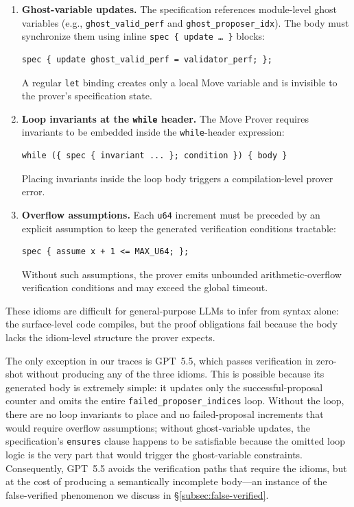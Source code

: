 \begin{enumerate}
    \item \textbf{Ghost-variable updates.}
    The specification references module-level ghost variables (e.g., \texttt{ghost\_valid\_perf} and \texttt{ghost\_proposer\_idx}).
    The body must synchronize them using inline \texttt{spec\,\{\,update\,\ldots\,\}} blocks:
    \begin{lstlisting}[language=Move,basicstyle=\small\ttfamily]
spec { update ghost_valid_perf = validator_perf; };
    \end{lstlisting}
    A regular \texttt{let} binding creates only a local Move variable and is invisible to the prover's specification state.

    \item \textbf{Loop invariants at the \texttt{while} header.}
    The Move Prover requires invariants to be embedded inside the \texttt{while}-header expression:
    \begin{lstlisting}[language=Move,basicstyle=\small\ttfamily]
while ({ spec { invariant ... }; condition }) { body }
    \end{lstlisting}
    Placing invariants inside the loop body triggers a compilation-level prover error.

    \item \textbf{Overflow assumptions.}
    Each \texttt{u64} increment must be preceded by an explicit assumption to keep the generated verification conditions tractable:
    \begin{lstlisting}[language=Move,basicstyle=\small\ttfamily]
spec { assume x + 1 <= MAX_U64; };
    \end{lstlisting}
    Without such assumptions, the prover emits unbounded arithmetic-overflow verification conditions and may exceed the global timeout.
\end{enumerate}

These idioms are difficult for general-purpose LLMs to infer from syntax alone: the surface-level code compiles, but the proof obligations fail because the body lacks the idiom-level structure the prover expects.

The only exception in our traces is GPT~5.5, which passes verification in zero-shot without producing any of the three idioms.
This is possible because its generated body is extremely simple: it updates only the successful-proposal counter and omits the entire \texttt{failed\_proposer\_indices} loop.
Without the loop, there are no loop invariants to place and no failed-proposal increments that would require overflow assumptions; without ghost-variable updates, the specification's \texttt{ensures} clause happens to be satisfiable because the omitted loop logic is the very part that would trigger the ghost-variable constraints.
Consequently, GPT~5.5 avoids the verification paths that require the idioms, but at the cost of producing a semantically incomplete body---an instance of the false-verified phenomenon we discuss in \S\ref{subsec:false-verified}.

